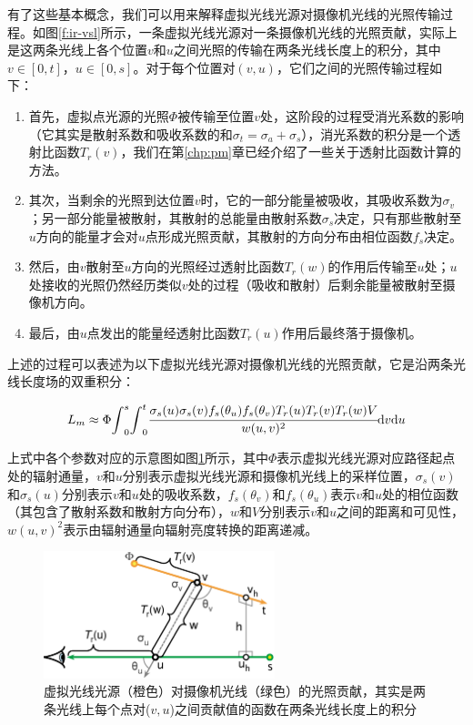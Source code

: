 有了这些基本概念，我们可以用来解释虚拟光线光源对摄像机光线的光照传输过程。如图\ref{f:ir-vsl}所示，一条虚拟光线光源对一条摄像机光线的光照贡献，实际上是这两条光线上各个位置$v$和$u$之间光照的传输在两条光线长度上的积分，其中$v\in[0,t]$，$u\in[0,s]$。对于每个位置对$(v,u)$，它们之间的光照传输过程如下：

\begin{enumerate}
	\item 首先，虚拟点光源的光照$\Phi$被传输至位置$v$处，这阶段的过程受消光系数的影响（它其实是散射系数和吸收系数的和$\sigma_t=\sigma_a+\sigma_s$），消光系数的积分是一个透射比函数$T_r(v)$，我们在第\ref{chp:pm}章已经介绍了一些关于透射比函数计算的方法。
	\item 其次，当剩余的光照到达位置$v$时，它的一部分能量被吸收，其吸收系数为$\sigma_v$；另一部分能量被散射，其散射的总能量由散射系数$\sigma_s$决定，只有那些散射至$u$方向的能量才会对$u$点形成光照贡献，其散射的方向分布由相位函数$f_s$决定。
	\item 然后，由$v$散射至$u$方向的光照经过透射比函数$T_r(w)$的作用后传输至$u$处；$u$处接收的光照仍然经历类似$v$处的过程（吸收和散射）后剩余能量被散射至摄像机方向。
	\item 最后，由$u$点发出的能量经透射比函数$T_r(u)$作用后最终落于摄像机。
\end{enumerate}

上述的过程可以表述为以下虚拟光线光源对摄像机光线的光照贡献，它是沿两条光线长度场的双重积分：

\begin{equation}\label{e:ir-vrl}
	L_m\approx\Phi{\rm \int}^{s}_0{\rm \int}^{t}_0  \cfrac{\sigma_s(u)\sigma_s(v)f_s(\theta_u)f_s(\theta_v)T_r(u)T_r(v)T_r(w)V}{w(u,v)^{2}}{\rm d}v{\rm d}u
\end{equation}

上式中各个参数对应的示意图如图\ref{f:ir-vrl}所示，其中$\Phi$表示虚拟光线光源对应路径起点处的辐射通量，$v$和$u$分别表示虚拟光线光源和摄像机光线上的采样位置，$\sigma_s(v)$和$\sigma_s(u)$分别表示$v$和$u$处的吸收系数，$f_s(\theta_v)$和$f_s(\theta_u)$表示$v$和$u$处的相位函数（其包含了散射系数和散射方向分布），$w$和$V$分别表示$v$和$u$之间的距离和可见性，$w(u,v)^{2}$表示由辐射通量向辐射亮度转换的距离递减。

\begin{figure}
	\sidecaption
	\includegraphics[width=0.6\textwidth]{figures/ir/vrl}
	\caption{虚拟光线光源（橙色）对摄像机光线（绿色）的光照贡献，其实是两条光线上每个点对($v,u$)之间贡献值的函数在两条光线长度上的积分}
	\label{f:ir-vrl}
\end{figure}

